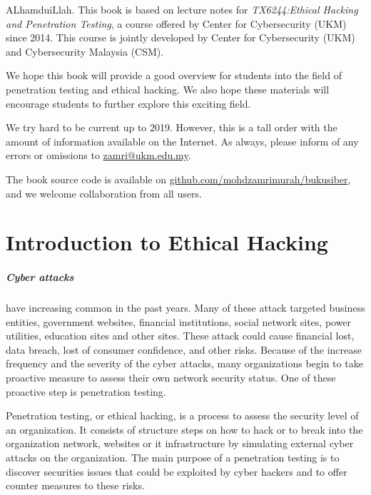 \documentclass[7x9]{times}
\begin{document}
\begin{preface}

ALhamduiLlah. This book is based on lecture notes for
\textit{TX6244:Ethical Hacking and Penetration Testing}, a course
offered by Center for Cybersecurity (UKM) since 2014. This course is
jointly developed by Center for Cybersecurity (UKM) and Cybersecurity
Malaysia (CSM).

We hope this book will provide a good overview for students into the
field of penetration testing and ethical hacking. We also hope these
materials will encourage students to further explore this exciting
field.

We try hard to be current up to 2019. However, this is a tall order
with the amount of information available on the Internet. As always,
please inform of any errors or omissions to \url{zamri@ukm.edu.my}.

The book source code is available on
\url{github.com/mohdzamrimurah/bukusiber}, and we welcome
collaboration from all users.



\end{preface}

\chapter{Introduction to Ethical Hacking}

\paragraph{Cyber attacks} have increasing common in the past
years. Many of these attack targeted business entities,
government websites, financial institutions, social network
sites, power utilities, education sites and other sites.
These attack could cause financial lost, data breach, lost
of consumer confidence, and other risks. Because of the
increase frequency and the severity of the cyber attacks,
many organizations begin to take proactive measure to assess
their own network security status. One of these proactive
step is penetration testing.

Penetration testing, or ethical hacking, is a process to
assess the security level of an organization. It consists of
structure steps on how to hack or to break into the
organization network, websites or it infrastructure by
simulating external cyber attacks on the organization. The
main purpose of a penetration testing is to discover
securities issues that could be exploited by cyber hackers
and to offer counter measures to these risks.
\end{document}
